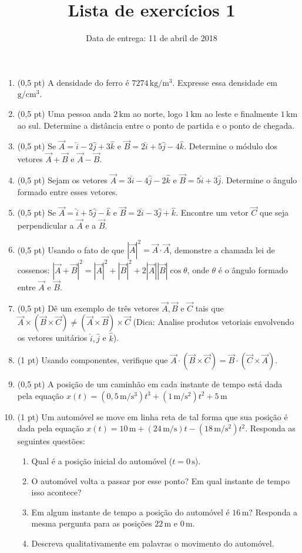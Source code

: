 \documentclass{amsart}
\title{Lista de exercícios 1}
\author{Data de entrega: 11 de abril de 2018}
\newcommand{\un}[1]{\mathrm{#1}}
\begin{document}
\maketitle
\begin{enumerate}
	\item (0,5 pt) A densidade do ferro é $7274\,\un{kg}/\un{m}^3$. Expresse essa densidade em $\un{g}/\un{cm}^3$.
	\item (0,5 pt) Uma pessoa anda $2\,\un{km}$ ao norte, logo $1\,\un{km}$ ao leste e finalmente $1\,\un{km}$ ao sul. Determine a distância entre o ponto de partida e o ponto de chegada.
	\item (0,5 pt) Se $\vec A=\hat i-2\hat j+3\hat k$ e $\vec B=2\hat i+5\hat j-4\hat k$. Determine o módulo dos vetores $\vec A+\vec B$ e $\vec A-\vec B$.
	\item (0,5 pt) Sejam os vetores $\vec A=3\hat i-4\hat j-2\hat k$ e $\vec B=5\hat i+3\hat j$. Determine o ângulo formado entre esses vetores. 
	\item (0,5 pt) Se $\vec A=\hat i+5\hat j-\hat k$ e $\vec B=2\hat i-3\hat j+\hat k$. Encontre um vetor $\vec C$ que seja perpendicular a $\vec A$ e a $\vec B$. 
	\item (0,5 pt) Usando o fato de que $|\vec A|^2=\vec A\cdot\vec A$, demonstre a chamada lei de cossenos: $|\vec A+\vec B|^2=|\vec A|^2+|\vec B|^2+2|\vec A||\vec B|\cos\theta$, onde $\theta$ é o ângulo formado entre $\vec A$ e $\vec B$.	
	\item (0,5 pt) Dê um exemplo de três vetores $\vec A, \vec B$ e $\vec C$ tais que $\vec A\times (\vec B\times \vec C)\ne (\vec A\times \vec B)\times\vec C$ (Dica: Analise produtos vetoriais envolvendo os vetores unitários $\hat i,\hat j$ e $\hat k$).
	\item (1 pt) Usando componentes, verifique que $\vec A\cdot(\vec B\times\vec C)=\vec B\cdot(\vec C\times \vec A)$.
	\item (0,5 pt) A posição de um caminhão em cada instante de tempo está dada pela equação $x(t)=(0,5 \,\un{m}/\un{s}^3)t^3+(1\,\un{m}/\un{s}^2)t^2+5\,\un{m}$
	\item (1 pt) Um automóvel se move em linha reta de tal forma que sua posição é dada pela equação $x(t)=10\,\un{m}+(24\,\un{m}/\un{s})t-(18\,\un{m}/\un{s^2})t^2$. Responda as seguintes questões:
	\begin{enumerate}
		\item Qual é a posição inicial do automóvel ($t=0\,\un{s}$).
		\item O automóvel volta a passar por esse ponto? Em qual instante de tempo isso acontece?
		\item Em algum instante de tempo a posição do automóvel é $16\,\un{m}$? Res\-pon\-da a mesma pergunta para as posições $22\,\un{m}$ e $0\,\un{m}$.
		\item Descreva qualitativamente em palavras o movimento do automóvel.
	\end{enumerate}
\end{enumerate}
\end{document}
